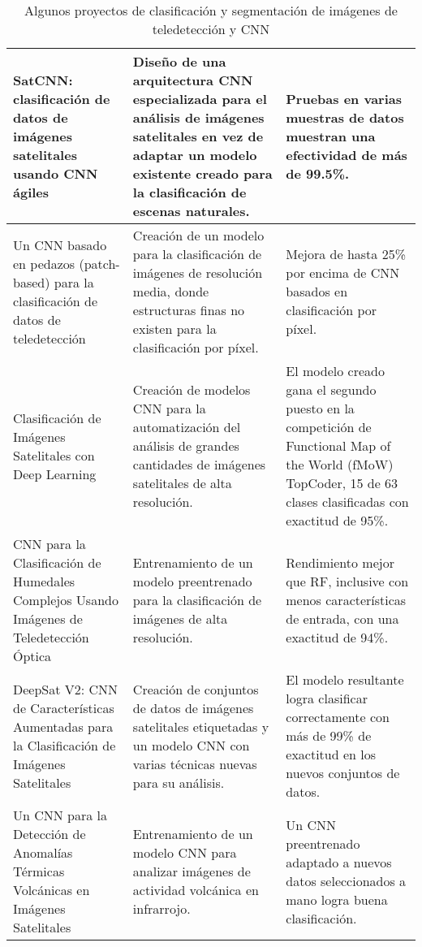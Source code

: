 \begin{center}
\begin{table}[h!]
\begin{tabular}{|m{4cm}|m{5cm}|m{6.2cm}|}
            \hline
            SatCNN: clasificación de datos de imágenes satelitales usando CNN ágiles \autocite{zhong-2016} & Diseño de
            una arquitectura CNN especializada para el análisis de imágenes satelitales en vez de adaptar un modelo
            existente creado para la clasificación de escenas naturales. & Pruebas en varias muestras de datos muestran
            una efectividad de más de 99.5\%. \\
            \hline
            Un CNN basado en pedazos (patch-based) para la clasificación de datos de teledetección
            \autocite{sharma-2017} & Creación de un modelo para la clasificación de imágenes de resolución media, donde
            estructuras finas no existen para la clasificación por píxel. & Mejora de hasta 25\% por encima de CNN
            basados en clasificación por píxel. \\
            \hline
            Clasificación de Imágenes Satelitales con Deep Learning \autocite{pritt-2017} & Creación de modelos CNN
            para la automatización del análisis de grandes cantidades de imágenes satelitales de alta resolución. & El
            modelo creado gana el segundo puesto en la competición de Functional Map of the World (fMoW) TopCoder, 15
            de 63 clases clasificadas con exactitud de 95\%. \\
            \hline
            CNN para la Clasificación de Humedales Complejos Usando Imágenes de Teledetección Óptica
            \autocite{rezaee-2018} & Entrenamiento de un modelo preentrenado para la clasificación de imágenes de alta
            resolución. & Rendimiento mejor que RF, inclusive con menos características de entrada, con una exactitud
            de 94\%. \\
            \hline
            DeepSat V2: CNN de Características Aumentadas para la Clasificación de Imágenes Satelitales
            \autocite{liu-2019} & Creación de conjuntos de datos de imágenes satelitales etiquetadas y un modelo CNN
            con varias técnicas nuevas para su análisis. & El modelo resultante logra clasificar correctamente con más
            de 99\% de exactitud en los nuevos conjuntos de datos. \\
            \hline
            Un CNN para la Detección de Anomalías Térmicas Volcánicas en Imágenes Satelitales \autocite{amato-2023} &
            Entrenamiento de un modelo CNN para analizar imágenes de actividad volcánica en infrarrojo. & Un CNN
            preentrenado adaptado a nuevos datos seleccionados a mano logra buena clasificación. \\
            \hline
        \end{tabular}
        \caption{Algunos proyectos de clasificación y segmentación de imágenes de teledetección y CNN}
        \label{table:1}
    \end{table}
    \vspace{-\topsep}
\end{center}

